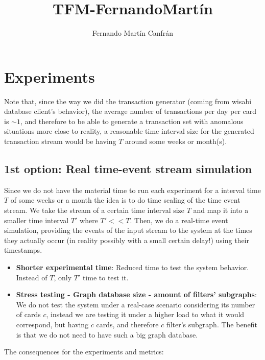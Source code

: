 \documentclass{article}
\title{TFM-FernandoMartín}
\author{Fernando Martín Canfrán}
\begin{document}
\section{Experiments}

Note that, since the way we did the transaction generator (coming from wisabi database client's behavior), the average number of transactions per day per card is $\sim1$, and therefore to be able to generate a transaction set with anomalous situations more close to reality, a reasonable time interval size for the generated transaction stream would be having $T$ around some weeks or month(s).

\subsection{1st option: Real time-event stream simulation}

Since we do not have the material time to run each experiment for a interval time $T$ of some weeks or a month the idea is to do time scaling of the time event stream. We take the stream of a certain time interval size $T$ and map it into a smaller time interval
$T'$ where $T' << T$. Then, we do a real-time event simulation, providing the events of the input stream to the system at the times they actually occur (in reality possibly with a small certain delay!) using their timestamps.

\begin{itemize}
  \item \textbf{Shorter experimental time}: Reduced time to test the system behavior. Instead of $T$, only $T'$ time to test it. 
  \item \textbf{Stress testing - Graph database size - amount of filters' subgraphs}: We do not test the system under a real-case scenario considering its number of cards $c$, instead we are testing it under a higher load to what it would correspond, but having $c$ cards, and therefore $c$ filter's subgraph. The benefit is that we do not need to have such a big graph database.
\end{itemize}

The consequences for the experiments and metrics:
\end{document}
